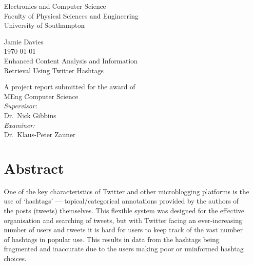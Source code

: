 \documentclass[12pt,a4paper]{article}
\begin{document}
\begin{titlepage}
\center
\vspace*{3cm}

{\Large
    Electronics and Computer Science\\
    Faculty of Physical Sciences and Engineering\\
    University of Southampton\\[1cm]
}

Jamie Davies\\
\today\\[1cm]

{\large
    Enhanced Content Analysis and Information\\
    Retrieval Using Twitter Hashtags\\[1cm]
}

A project report submitted for the award of\\
MEng Computer Science\\[1cm]

\emph{Supervisor:}\\
Dr.\ Nick Gibbins\\[0.5cm]

\emph{Examiner:}\\
Dr.\ Klaus-Peter Zauner\\


\vfill
\end{titlepage}

\section*{Abstract}
One of the key characteristics of Twitter and other microblogging platforms is the use of `hashtags' --- topical/categorical annotations provided by the authors of the posts (tweets) themselves. This flexible system was designed for the effective organisation and searching of tweets, but with Twitter facing an ever-increasing number of users and tweets it is hard for users to keep track of the vast number of hashtags in popular use. This results in data from the hashtags being fragmented and inaccurate due to the users making poor or uninformed hashtag choices.
\end{document}
